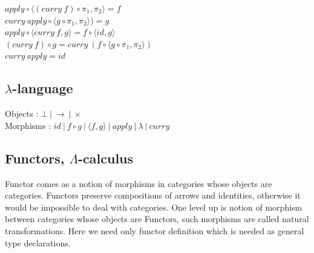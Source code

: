 \documentclass[11pt,oneside]{article}
\begin{document}
\begingroup
\parbox[t][][l]{0.40\textwidth}{

\begin{prooftree}
\end{prooftree}

\begin{prooftree}
\end{prooftree}

\begin{prooftree}
\end{prooftree}

}
\hspace{0.1cm}
\parbox[t][][r]{0.60\textwidth}{

\begin{center}
$apply \circ \langle (curry\ f) \circ \pi_1 , \pi_2 \rangle = f$\\
$curry\ apply \circ \langle g \circ \pi_1, \pi_2 \rangle) = g$\\
$apply \circ \langle curry\ f, g \rangle = f \circ \langle id , g\rangle$\\
$(curry\ f) \circ g = curry\ (f \circ \langle g \circ \pi_1,\pi_2\rangle)$\\
$curry\ apply = id$\\
\end{center}


}
\endgroup

\subsection{$\lambda$-language}

\begin{center}
Objects : $\bot\ |\ \rightarrow\ |\ \times$\\
Morphisms : $id\ |\ f \circ g\ |\ \langle f, g \rangle\ |\ apply\ |\ \lambda\ |\ curry$
\end{center}

  \subsection{Functors, $\Lambda$-calculus}

  Functor comes as a notion of morphisms in categories whose objects are categories.
  Functors preserve compositions of arrows and identities, otherwise it would
  be impossible to deal with categories. One level up is notion of morphism between categories whose
  objects are Functors, such morphisms are called natural transformations. Here we need
  only functor definition which is needed as general type declarations.
\end{document}
